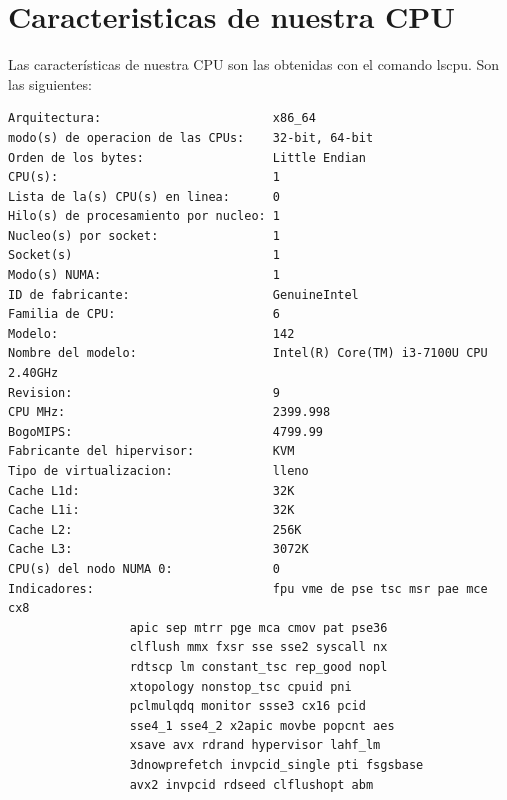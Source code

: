 	\section[Caracteristicas de nuestra CPU]{Caracteristicas de nuestra CPU}
	
	Las características de nuestra CPU son las obtenidas con el comando lscpu. Son las siguientes:
	
	\lstset{language=C}
	\begin{lstlisting}[frame=single]
Arquitectura:                        x86_64
modo(s) de operacion de las CPUs:    32-bit, 64-bit
Orden de los bytes:                  Little Endian
CPU(s):                              1
Lista de la(s) CPU(s) en linea:      0
Hilo(s) de procesamiento por nucleo: 1
Nucleo(s) por socket:                1
Socket(s)                            1
Modo(s) NUMA:                        1
ID de fabricante:                    GenuineIntel
Familia de CPU:                      6
Modelo:                              142
Nombre del modelo:                   Intel(R) Core(TM) i3-7100U CPU 2.40GHz
Revision:                            9
CPU MHz:                             2399.998
BogoMIPS:                            4799.99
Fabricante del hipervisor:           KVM
Tipo de virtualizacion:              lleno
Cache L1d:                           32K
Cache L1i:                           32K
Cache L2:                            256K
Cache L3:                            3072K
CPU(s) del nodo NUMA 0:              0
Indicadores:                         fpu vme de pse tsc msr pae mce cx8 
				 apic sep mtrr pge mca cmov pat pse36 
				 clflush mmx fxsr sse sse2 syscall nx 
				 rdtscp lm constant_tsc rep_good nopl 
				 xtopology nonstop_tsc cpuid pni 
				 pclmulqdq monitor ssse3 cx16 pcid 
				 sse4_1 sse4_2 x2apic movbe popcnt aes
				 xsave avx rdrand hypervisor lahf_lm 
				 3dnowprefetch invpcid_single pti fsgsbase
				 avx2 invpcid rdseed clflushopt abm
	\end{lstlisting}
		

	



